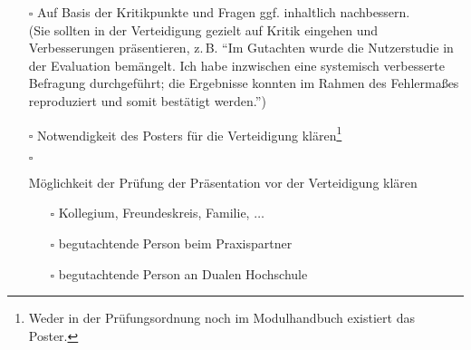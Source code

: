 \begin{itemize}
{\begin{itemize}
{                \begin{itemize}
                    \item[$\square$] Gutachten Praxispartner
                    \item[$\square$] Gutachten Duale Hochschule
                \end{itemize}
            }
            \item[$\square$]{
                Auf Basis der Kritikpunkte und Fragen ggf. inhaltlich nachbessern.\\
                (Sie sollten in der Verteidigung gezielt auf Kritik eingehen und Verbesserungen präsentieren, z.\,B. \enquote{Im Gutachten wurde die Nutzerstudie in der Evaluation bemängelt. Ich habe inzwischen eine systemisch verbesserte Befragung durchgeführt; die Ergebnisse konnten im Rahmen des Fehlermaßes reproduziert und somit bestätigt werden.})
            }         
            \item[$\square$] Notwendigkeit des Posters für die Verteidigung klären\footnote{Weder in der Prüfungsordnung noch im Modulhandbuch existiert das Poster.}
            \item[$\square$]{
                Möglichkeit der Prüfung der Präsentation vor der Verteidigung klären
                \begin{itemize}
                    \item[$\square$] Kollegium, Freundeskreis, Familie, $\ldots$
                    \item[$\square$] begutachtende Person beim Praxispartner
                    \item[$\square$] begutachtende Person an Dualen Hochschule
                \end{itemize}
            }
        \end{itemize}
    }
\end{itemize}